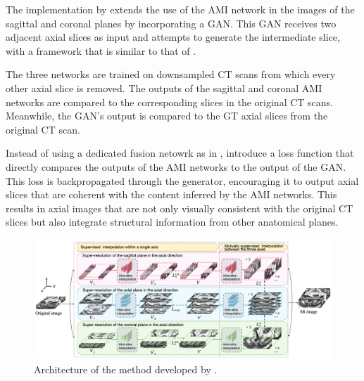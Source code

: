 \par
The implementation by \textcite{Zhang2024} extends the use of the AMI network in the images of the sagittal and coronal planes by incorporating a GAN. This GAN receives two adjacent axial slices as input and attempts to generate the intermediate slice, with a framework that is similar to that of \textcite{Lopez2023}.
\par
The three networks are trained on downsampled CT scans from which every other axial slice is removed. The outputs of the sagittal and coronal AMI networks are compared to the corresponding slices in the original CT scans. Meanwhile, the GAN's output is compared to the GT axial slices from the original CT scan.
\par
Instead of using a dedicated fusion netowrk as in \textcite{Peng2020}, \textcite{Zhang2024} introduce a loss function that directly compares the outputs of the AMI networks to the output of the GAN. This loss is backpropagated through the generator, encouraging it to output axial slices that are coherent with the content inferred by the AMI networks. This results in axial images that are not only visually consistent with the original CT slices but also integrate structural information from other anatomical planes.

\begin{figure}[!ht]
	\hspace*{-0.35in}
	\includegraphics[width=1.1\linewidth]{figures/ZhangFramework.png}
	\caption{Architecture of the method developed by \textcite{Zhang2024}.}
	\label{fig:ZhangFramework}
\end{figure}

